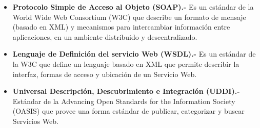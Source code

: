 \documentclass[12pt,letterpaper,titlepage]{article}
\begin{document}
\begin{itemize}\itemsep=0pt
\item  \textbf{Protocolo Simple de Acceso al Objeto (SOAP).-} Es un estándar de la World Wide Web Consortium (W3C) que describe un formato de mensaje (basado en XML) y mecanismos para intercambiar información entre aplicaciones, en un ambiente distribuido y descentralizado.\\
\item  \textbf{Lenguaje de Definición del servicio Web (WSDL).-} Es un estándar de la W3C que define un lenguaje basado en XML que permite describir la interfaz, formas de acceso y ubicación de un Servicio Web.\\
\item  \textbf{Universal Descripción, Descubrimiento e Integración (UDDI).-} Estándar de la
Advancing Open Standards for the Information Society (OASIS) que provee una forma estándar de publicar, categorizar y buscar Servicios Web.\\
\end{itemize}




\newpage

%
%

\end{document}
